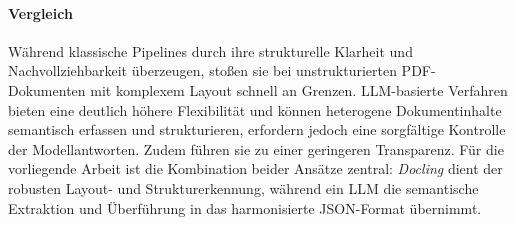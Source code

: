 \paragraph{Vergleich}
Während klassische Pipelines durch ihre strukturelle Klarheit und Nachvollziehbarkeit überzeugen, 
stoßen sie bei unstrukturierten PDF-Dokumenten mit komplexem Layout schnell an Grenzen. 
LLM-basierte Verfahren bieten eine deutlich höhere Flexibilität und können heterogene Dokumentinhalte semantisch erfassen und strukturieren, 
erfordern jedoch eine sorgfältige Kontrolle der Modellantworten. Zudem führen sie zu einer geringeren Transparenz.
Für die vorliegende Arbeit ist die Kombination beider Ansätze zentral: 
\emph{Docling} dient der robusten Layout- und Strukturerkennung, während ein LLM die semantische Extraktion und Überführung in das harmonisierte JSON-Format übernimmt.



